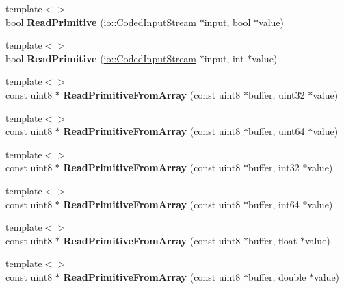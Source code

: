 \begin{DoxyCompactItemize}
{\footnotesize template$<$$>$ }\\bool {\bfseries Read\+Primitive} (\hyperlink{classgoogle_1_1protobuf_1_1io_1_1CodedInputStream}{io\+::\+Coded\+Input\+Stream} $\ast$input, bool $\ast$value)
\item 
\mbox{\label{classgoogle_1_1protobuf_1_1internal_1_1WireFormatLite_a0bc22007a6072cc65f70fff13ea00771}} 
{\footnotesize template$<$$>$ }\\bool {\bfseries Read\+Primitive} (\hyperlink{classgoogle_1_1protobuf_1_1io_1_1CodedInputStream}{io\+::\+Coded\+Input\+Stream} $\ast$input, int $\ast$value)
\item 
\mbox{\label{classgoogle_1_1protobuf_1_1internal_1_1WireFormatLite_af24ae7347bb5992a14fdc3d81c55379a}} 
{\footnotesize template$<$$>$ }\\const uint8 $\ast$ {\bfseries Read\+Primitive\+From\+Array} (const uint8 $\ast$buffer, uint32 $\ast$value)
\item 
\mbox{\label{classgoogle_1_1protobuf_1_1internal_1_1WireFormatLite_a0e731d077b992a88ac4619a1e7210dbb}} 
{\footnotesize template$<$$>$ }\\const uint8 $\ast$ {\bfseries Read\+Primitive\+From\+Array} (const uint8 $\ast$buffer, uint64 $\ast$value)
\item 
\mbox{\label{classgoogle_1_1protobuf_1_1internal_1_1WireFormatLite_a3013339bb1f86cee5d8edba50348af51}} 
{\footnotesize template$<$$>$ }\\const uint8 $\ast$ {\bfseries Read\+Primitive\+From\+Array} (const uint8 $\ast$buffer, int32 $\ast$value)
\item 
\mbox{\label{classgoogle_1_1protobuf_1_1internal_1_1WireFormatLite_ade2fe008e4cc916d038d39a07cb7c402}} 
{\footnotesize template$<$$>$ }\\const uint8 $\ast$ {\bfseries Read\+Primitive\+From\+Array} (const uint8 $\ast$buffer, int64 $\ast$value)
\item 
\mbox{\label{classgoogle_1_1protobuf_1_1internal_1_1WireFormatLite_a12abb0495e864501522e7ea431344c3a}} 
{\footnotesize template$<$$>$ }\\const uint8 $\ast$ {\bfseries Read\+Primitive\+From\+Array} (const uint8 $\ast$buffer, float $\ast$value)
\item 
\mbox{\label{classgoogle_1_1protobuf_1_1internal_1_1WireFormatLite_acc8feb3af8f37ea2fc3452e10dff804e}} 
{\footnotesize template$<$$>$ }\\const uint8 $\ast$ {\bfseries Read\+Primitive\+From\+Array} (const uint8 $\ast$buffer, double $\ast$value)
\end{DoxyCompactItemize}
